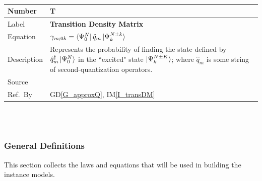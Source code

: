 \documentclass[12pt]{article}
\newcommand{\colAwidth}{0.13\textwidth}
\newcommand{\colBwidth}{0.82\textwidth}
\newcommand{\dref}[1]{GD\ref{#1}}
\newcounter{theorynum} %
\newcommand{\iref}[1]{IM\ref{#1}}
\begin{document}
~\newline

\noindent
\begin{minipage}{\textwidth}
	\renewcommand*{\arraystretch}{1.5}
	\begin{tabular}{| p{\colAwidth} | p{\colBwidth}|}
		\hline
		\rowcolor[gray]{0.9}
		Number& T{theorynum}\thetheorynum 
		\label{T_transitionDM}\\
		\hline
		Label&\bf Transition Density Matrix\\
		\hline
		Equation&  $\gamma_{m;0k} = \bra{\Psi^{N}_0}\hat{q}_m\ket{\Psi^{N\pm 
		k}_k}$ \\
		\hline
		Description & 
		Represents the probability of finding the state defined by 
		$\hat{q}^{\dagger}_m 
		\ket{\Psi^{N}_0}$ in the ``excited" state $\ket{\Psi^{N\pm K}_k}$; 
		where 
		$\hat{q}_m$ is some 
		string of second-quantization operators.\\
		\hline
		Source & \cite{Pernal2018}\\
		\hline
		Ref.\ By & \dref{G_approxQ}, \iref{I_transDM}\\
		\hline
	\end{tabular}
\end{minipage}\\

~\newline

\subsubsection{General Definitions}\label{sec_gendef}

This section collects the laws and equations that will be used in building the
instance models.

~\newline
\end{document}
